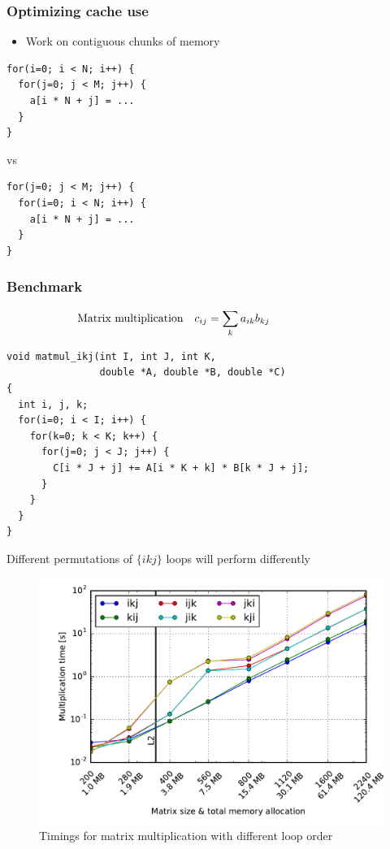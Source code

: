 \documentclass[usenames,dvipsnames,mathserif,compress]{beamer}
\begin{document}
\begin{frame}[fragile]
  \frametitle{Optimizing cache use}
  \begin{itemize}
  \item Work on contiguous chunks of memory
  \end{itemize}
\begin{lstlisting}
for(i=0; i < N; i++) {
  for(j=0; j < M; j++) {
    a[i * N + j] = ...
  }
}
\end{lstlisting}
vs
\begin{lstlisting}
for(j=0; j < M; j++) {
  for(i=0; i < N; i++) {
    a[i * N + j] = ...
  }
}
\end{lstlisting}
\end{frame}

\begin{frame}[fragile]
  \frametitle{Benchmark}
  \begin{align}
    \hspace{-2cm} \textrm{Matrix multiplication}\quad c_{ij} &= \sum_k a_{ik} b_{kj}\nonumber
  \end{align}
\begin{lstlisting}
void matmul_ikj(int I, int J, int K,
                double *A, double *B, double *C)
{
  int i, j, k;
  for(i=0; i < I; i++) {
    for(k=0; k < K; k++) {
      for(j=0; j < J; j++) {
        C[i * J + j] += A[i * K + k] * B[k * J + j];
      }
    }
  }
}
\end{lstlisting}
Different permutations of $\{ikj\}$ loops will perform differently
\end{frame}


\begin{frame}
  \begin{figure}
  \includegraphics[width=\textwidth]{code/timings-matmul}
  \caption{Timings for matrix multiplication with different loop order}
  \end{figure}
\end{frame}
\end{document}
